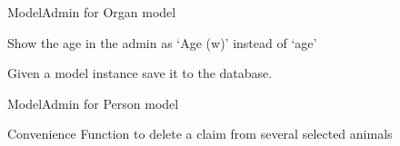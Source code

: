 \documentclass[letterpaper,10pt,openany,oneside,english]{sphinxmanual}
\begin{document}
\begin{fulllineitems}
\label{\detokenize{index:animals.admin.OrganAdmin}}
ModelAdmin for Organ model

\begin{fulllineitems}
\label{\detokenize{index:animals.admin.OrganAdmin.age}}
Show the age in the admin as ‘Age (w)’ instead of ‘age’

\end{fulllineitems}


\begin{fulllineitems}
\label{\detokenize{index:animals.admin.OrganAdmin.save_model}}
Given a model instance save it to the database.

\end{fulllineitems}


\end{fulllineitems}


\begin{fulllineitems}
\label{\detokenize{index:animals.admin.PersonAdmin}}
ModelAdmin for Person model

\end{fulllineitems}


\begin{fulllineitems}
\label{\detokenize{index:animals.admin.clear_claim}}
Convenience Function to delete a claim from several selected animals

\end{fulllineitems}
\end{document}
